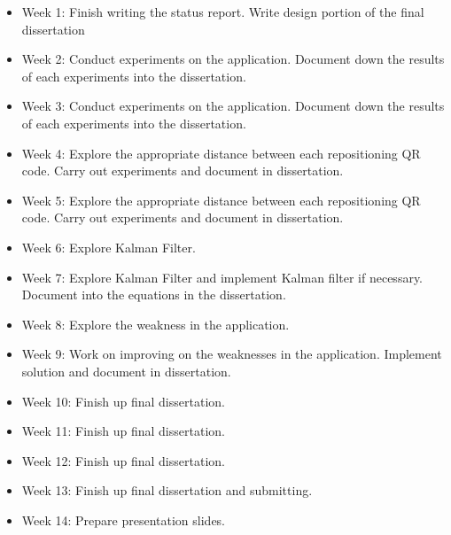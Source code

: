\documentclass[11pt]{article}
\begin{document}
\begin{itemize}
  \item Week 1: Finish writing the status report. Write design portion of the final dissertation
  \item Week 2: Conduct experiments on the application. Document down the results of each experiments into the dissertation.
  \item Week 3: Conduct experiments on the application. Document down the results of each experiments into the dissertation.
  \item Week 4: Explore the appropriate distance between each repositioning QR code. Carry out experiments and document in dissertation.
  \item Week 5: Explore the appropriate distance between each repositioning QR code. Carry out experiments and document in dissertation.
  \item Week 6: Explore Kalman Filter.
  \item Week 7: Explore Kalman Filter and implement Kalman filter if necessary. Document into the equations in the dissertation.
  \item Week 8: Explore the weakness in the application.
  \item Week 9: Work on improving on the weaknesses in the application. Implement solution and document in dissertation.
  \item Week 10: Finish up final dissertation.
  \item Week 11: Finish up final dissertation.
  \item Week 12: Finish up final dissertation.
  \item Week 13: Finish up final dissertation and submitting.
  \item Week 14: Prepare presentation slides.
\end{itemize}




    
    
    
\end{document}
